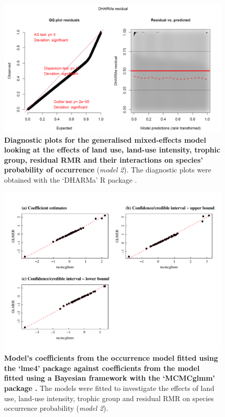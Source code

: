 \begin{figure}[h!]
\centering
\includegraphics[scale=0.7]{Supporting/Chapter5/Figures/Diagnostic_plot_occurrence.png}
\caption[Diagnostic plots for the generalised mixed-effects model looking at the effects of land use, land-use intensity, trophic group, residual RMR and their interactions on species' probability of occurrence]{\textbf{Diagnostic plots for the generalised mixed-effects model looking at the effects of land use, land-use intensity, trophic group, residual RMR and their interactions on species' probability of occurrence} (\textit{model 2}). The diagnostic plots were obtained with the `DHARMa' R package \citep{DHARMa}.}
\label{SI5_figure6}
\end{figure}

\begin{figure}[h!]
\centering
\includegraphics[scale=0.8]{Supporting/Chapter5/Figures/Occurrence_model_GLMER_mcmcglmm_coefs}
\caption[Model's coefficients from the occurrence model fitted using the `lme4' package against coefficients from the model fitted using the `MCMCglmm' package]{\textbf{Model's coefficients from the occurrence model fitted using the `lme4' package \citep{Bates2015} against coefficients from the model fitted using a Bayesian framework with the `MCMCglmm' package \citep{mcmcglmm}.} The models were fitted to investigate the effects of land use, land-use intensity, trophic group and residual RMR on species occurrence probability (\textit{model 2}).}
\label{SI5_figure7}
\end{figure}

